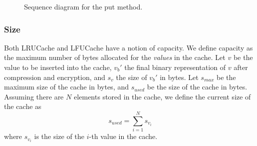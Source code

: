 \documentclass[11pt, journal]{IEEEtran}
\begin{document}
\begin{figure}
    \caption{Sequence diagram for the put method.}
    \label{fig:put_sequence_diagram}
\end{figure}

\subsubsection{Size}
\label{sec:size_description}
Both LRUCache and LFUCache have a notion of capacity. We define capacity
as the maximum number of bytes allocated for the \textit{values} in the cache.
Let $v$ be the value to be inserted into the cache, $v_b'$
the final binary representation of $v$ after compression and encryption,
and $s_v$ the size of $v_b'$ in bytes.
Let $s_{max}$ be the maximum size
of the cache in bytes, and $s_{used}$ be the size of the cache in bytes. Assuming
there are $N$ elements stored in the cache, we define the current size of the cache
as $$ s_{used} = \sum_{i=1}^{N} s_{v_i}$$
where $s_{v_i}$ is the size of the $i$-th value in the cache.
\end{document}
